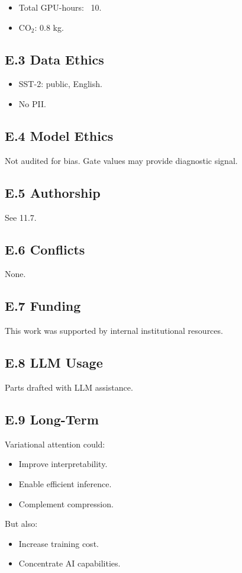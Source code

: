 \begin{itemize}
\item Total GPU-hours: ~10.
\item CO$_2$: 0.8 kg.

\end{itemize}
\subsection{E.3 Data Ethics}

\begin{itemize}
\item SST-2: public, English.
\item No PII.

\end{itemize}
\subsection{E.4 Model Ethics}

Not audited for bias. Gate values may provide diagnostic signal.

\subsection{E.5 Authorship}

See  11.7.

\subsection{E.6 Conflicts}

None.

\subsection{E.7 Funding}

This work was supported by internal institutional resources.

\subsection{E.8 LLM Usage}

Parts drafted with LLM assistance.

\subsection{E.9 Long-Term}

Variational attention could:
\begin{itemize}
\item Improve interpretability.
\item Enable efficient inference.
\item Complement compression.

\end{itemize}
But also:
\begin{itemize}
\item Increase training cost.
\item Concentrate AI capabilities.

\end{itemize}


